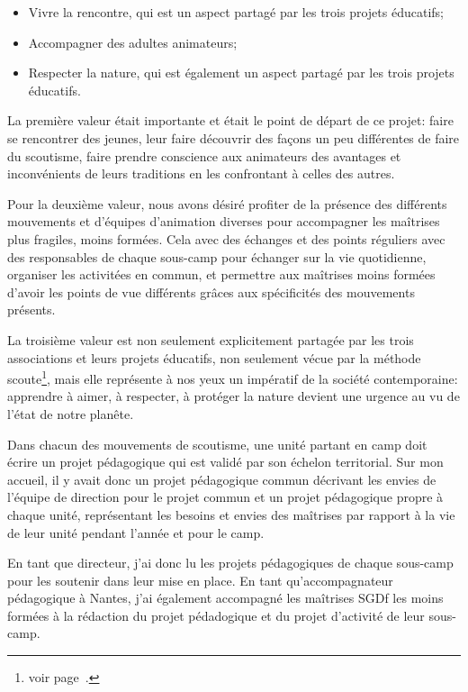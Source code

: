 \documentclass[titlepage,11pt,a4paper]{article}
\begin{document}
\begin{itemize}
   \item Vivre la rencontre, qui est un aspect partagé par les trois projets éducatifs;
   \item Accompagner des adultes animateurs;
   \item Respecter la nature, qui est également un aspect partagé par les trois projets
      éducatifs.
\end{itemize}

La première valeur était importante et était le point de départ de ce projet: faire se
rencontrer des jeunes, leur faire découvrir des façons un peu différentes de faire du
scoutisme, faire prendre conscience aux animateurs des avantages et inconvénients de leurs
traditions en les confrontant à celles des autres.

Pour la deuxième valeur, nous avons désiré profiter de la présence des différents mouvements et d'équipes
d'animation diverses pour accompagner les maîtrises plus fragiles, moins formées.
Cela avec des échanges et des points réguliers avec des responsables de chaque sous-camp
pour échanger sur la vie quotidienne, organiser les activitées en commun, et permettre aux
maîtrises moins formées d'avoir les points de vue différents grâces aux spécificités des
mouvements présents.

La troisième valeur est non seulement explicitement partagée par les trois associations et
leurs projets éducatifs, non seulement vécue par la méthode scoute\footnote{voir
page~\pageref{methsc}.}, mais elle représente à nos yeux un impératif de la société
contemporaine: apprendre à aimer, à respecter, à protéger la nature devient une urgence au
vu de l'état de notre planête.

Dans chacun des mouvements de scoutisme, une unité partant en camp doit écrire un
projet pédagogique qui est validé par son échelon territorial. Sur mon accueil, il y avait
donc un projet pédagogique commun décrivant les envies de l'équipe de direction pour le
projet commun et un projet pédagogique propre à chaque unité, représentant les besoins et
envies des maîtrises par rapport à la vie de leur unité pendant l'année et pour le camp.

En tant que directeur, j'ai donc lu les projets pédagogiques de chaque sous-camp pour les
soutenir dans leur mise en place. En tant qu'accompagnateur pédagogique à Nantes, j'ai
également accompagné les maîtrises SGDf les moins formées à la rédaction du projet
pédadogique et du projet d'activité de leur sous-camp.
\end{document}
